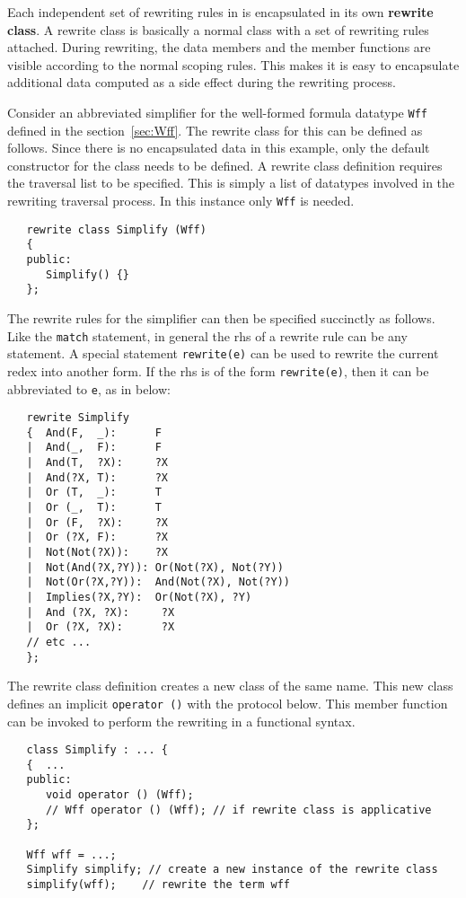    Each independent set of rewriting rules in \Prop{} is encapsulated
in its own {\bf rewrite class}.  A rewrite class is basically a normal \Cpp{}
class with a set of rewriting rules attached.   During rewriting, the
data members and the member functions are visible according to the normal
\Cpp{} scoping rules.  This makes it is easy to encapsulate additional data
computed as a side effect during the rewriting process.
 
 
   Consider an abbreviated simplifier for the well-formed formula datatype
\verb|Wff| defined in the section~\ref{sec:Wff}.  The rewrite class for this
can be defined as follows.  Since there is no encapsulated data in this
example, only the default constructor for the class needs to be defined.
A rewrite class definition requires the traversal list to be
specified.  This is simply a list of datatypes 
involved in the rewriting traversal process.  
In this instance only \verb|Wff| is needed.
 
\begin{verbatim}
   rewrite class Simplify (Wff)
   {
   public:
      Simplify() {}
   };
\end{verbatim}
 
   The rewrite rules for the simplifier can then be specified succinctly as
follows.  Like the \verb|match| statement, in general the rhs
of a rewrite rule can be any statement.  A special statement
\verb|rewrite(e)| can be used to rewrite the current redex into another form.
If the rhs is of the form \verb|rewrite(e)|, then it can be abbreviated
to \verb|e|, as in below:
\begin{verbatim}
   rewrite Simplify
   {  And(F,  _):      F
   |  And(_,  F):      F
   |  And(T,  ?X):     ?X
   |  And(?X, T):      ?X
   |  Or (T,  _):      T
   |  Or (_,  T):      T
   |  Or (F,  ?X):     ?X
   |  Or (?X, F):      ?X
   |  Not(Not(?X)):    ?X
   |  Not(And(?X,?Y)): Or(Not(?X), Not(?Y))
   |  Not(Or(?X,?Y)):  And(Not(?X), Not(?Y))
   |  Implies(?X,?Y):  Or(Not(?X), ?Y)
   |  And (?X, ?X):     ?X
   |  Or (?X, ?X):      ?X
   // etc ...
   };
\end{verbatim}
 
The rewrite class definition creates a new class of the same name.  This new
class defines an implicit \verb|operator ()| with the protocol below.  This
member function can be invoked to perform the rewriting in a functional
syntax.
 
\begin{verbatim}
   class Simplify : ... {
   {  ...
   public:
      void operator () (Wff);
      // Wff operator () (Wff); // if rewrite class is applicative
   };
 
   Wff wff = ...;
   Simplify simplify; // create a new instance of the rewrite class
   simplify(wff);    // rewrite the term wff
\end{verbatim}


